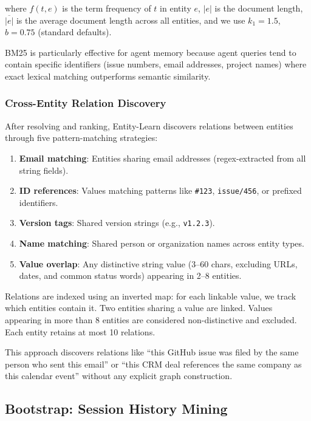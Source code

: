 \documentclass[11pt,twocolumn]{article}
\begin{document}
where $f(t, e)$ is the term frequency of $t$ in entity $e$, $|e|$ is the document length, $\overline{|e|}$ is the average document length across all entities, and we use $k_1 = 1.5$, $b = 0.75$ (standard defaults).

BM25 is particularly effective for agent memory because agent queries tend to contain specific identifiers (issue numbers, email addresses, project names) where exact lexical matching outperforms semantic similarity.

\subsubsection{Cross-Entity Relation Discovery}
\label{sec:relations}

After resolving and ranking, Entity-Learn discovers relations between entities through five pattern-matching strategies:

\begin{enumerate}[leftmargin=1.5em,itemsep=2pt]
  \item \textbf{Email matching}: Entities sharing email addresses (regex-extracted from all string fields).
  \item \textbf{ID references}: Values matching patterns like \texttt{\#123}, \texttt{issue/456}, or prefixed identifiers.
  \item \textbf{Version tags}: Shared version strings (e.g., \texttt{v1.2.3}).
  \item \textbf{Name matching}: Shared person or organization names across entity types.
  \item \textbf{Value overlap}: Any distinctive string value (3--60 chars, excluding URLs, dates, and common status words) appearing in 2--8 entities.
\end{enumerate}

Relations are indexed using an inverted map: for each linkable value, we track which entities contain it.
Two entities sharing a value are linked.
Values appearing in more than 8 entities are considered non-distinctive and excluded.
Each entity retains at most 10 relations.

This approach discovers relations like ``this GitHub issue was filed by the same person who sent this email'' or ``this CRM deal references the same company as this calendar event'' without any explicit graph construction.


\subsection{Bootstrap: Session History Mining}
\label{sec:bootstrap}
\end{document}
